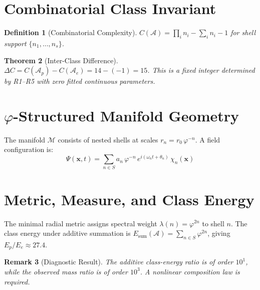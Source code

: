 \documentclass[12pt]{article}
\newtheorem{theorem}{Theorem}
\newtheorem{definition}[theorem]{Definition}
\newtheorem{remark}[theorem]{Remark}
\newcommand{\Mcal}{\mathcal{M}}
\newcommand{\Acal}{\mathcal{A}}
\newcommand{\phig}{\varphi}
\begin{document}
\section{Combinatorial Class Invariant}\label{sec:invariant}

\begin{definition}[Combinatorial Complexity]
$C(\Acal) = \prod_{i} n_i - \sum_{i} n_i - 1$ for shell support $\{n_1, \ldots, n_s\}$.
\end{definition}

\begin{theorem}[Inter-Class Difference]\label{thm:deltaC}
$\Delta C = C(\Acal_p) - C(\Acal_e) = 14 - (-1) = 15$. This is a fixed integer determined by R1--R5 with zero fitted continuous parameters.
\end{theorem}

\section{$\phig$-Structured Manifold Geometry}\label{sec:manifold}

The manifold $\Mcal$ consists of nested shells at scales $r_n = r_0\, \phig^{-n}$. A field configuration is:
\begin{equation}
    \Psi(\mathbf{x}, t) = \sum_{n \in S} a_n\, \phig^{-n}\, e^{i(\omega_n t + \theta_n)}\, \chi_n(\mathbf{x})
\end{equation}

\section{Metric, Measure, and Class Energy}\label{sec:metric}

The minimal radial metric assigns spectral weight $\lambda(n) = \phig^{2n}$ to shell $n$. The class energy under additive summation is $E_{\mathrm{sum}}(\Acal) = \sum_{n \in S} \phig^{2n}$, giving $E_p / E_e \approx 27.4$.

\begin{remark}[Diagnostic Result]
The additive class-energy ratio is of order $10^1$, while the observed mass ratio is of order $10^3$. A nonlinear composition law is required.
\end{remark}
\end{document}
